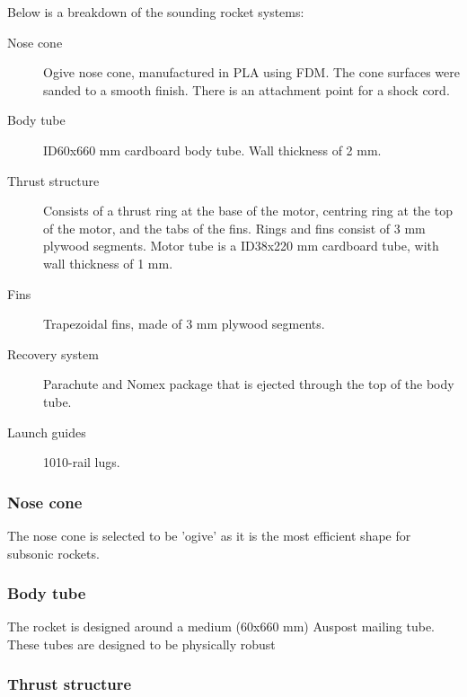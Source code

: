 \documentclass{article}
\begin{document}
Below is a breakdown of the sounding rocket systems:

\begin{description}
    \item [Nose cone] Ogive nose cone, manufactured in PLA using FDM. 
	The cone surfaces were sanded to a smooth finish.
	 There is an attachment point for a shock cord.
    \item [Body tube] ID60x660 mm cardboard body tube. 
	Wall thickness of 2 mm.
    \item [Thrust structure] Consists of a thrust ring at the base of the motor, 
	centring ring at the top of the motor, 
	and the tabs of the fins. 
	Rings and fins consist of 3 mm plywood segments. 
	Motor tube is a ID38x220 mm cardboard tube, 
	with wall thickness of 1 mm. 
    \item [Fins] Trapezoidal fins, 
	made of 3 mm plywood segments.
    \item [Recovery system] Parachute and Nomex package that is ejected through the top of the body tube.
    \item [Launch guides] 1010-rail lugs.
\end{description}


\subsubsection{Nose cone}


The nose cone is selected to be 'ogive' as it is the most efficient shape for subsonic rockets.

\subsubsection{Body tube}


The rocket is designed around a medium (60x660 mm) Auspost mailing tube. 
These tubes are designed to be physically robust

\subsubsection{Thrust structure}
\end{document}
